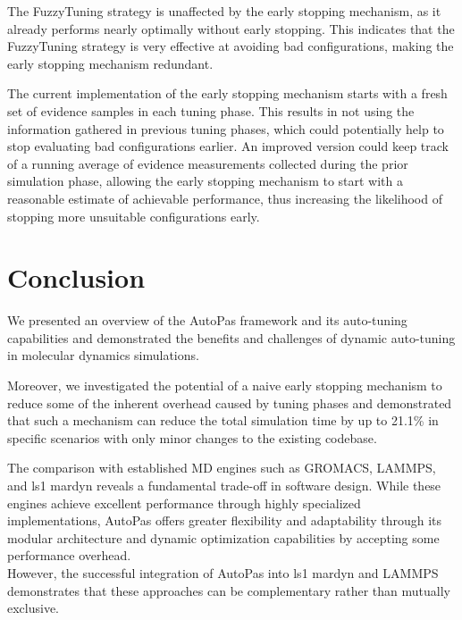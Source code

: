 \documentclass[conference]{IEEEtran}
\begin{document}
\begin{description}[leftmargin=1.2em, font=\itshape, style=nextline]
        The FuzzyTuning strategy is unaffected by the early stopping mechanism, as it already performs nearly optimally without early stopping. This indicates that the FuzzyTuning strategy is very effective at avoiding bad configurations, making the early stopping mechanism redundant.

    \item[Future Work:]
        The current implementation of the early stopping mechanism starts with a fresh set of evidence samples in each tuning phase. This results in not using the information gathered in previous tuning phases, which could potentially help to stop evaluating bad configurations earlier. An improved version could keep track of a running average of evidence measurements collected during the prior simulation phase, allowing the early stopping mechanism to start with a reasonable estimate of achievable performance, thus increasing the likelihood of stopping more unsuitable configurations early.
\end{description}

\section{Conclusion}

We presented an overview of the AutoPas framework and its auto-tuning capabilities and demonstrated the benefits and challenges of dynamic auto-tuning in molecular dynamics simulations.

Moreover, we investigated the potential of a naive early stopping mechanism to reduce some of the inherent overhead caused by tuning phases and demonstrated that such a mechanism can reduce the total simulation time by up to 21.1\% in specific scenarios with only minor changes to the existing codebase.

The comparison with established MD engines such as GROMACS, LAMMPS, and ls1 mardyn reveals a fundamental trade-off in software design. While these engines achieve excellent performance through highly specialized implementations, AutoPas offers greater flexibility and adaptability through its modular architecture and dynamic optimization capabilities by accepting some performance overhead.\\
However, the successful integration of AutoPas into ls1 mardyn and LAMMPS demonstrates that these approaches can be complementary rather than mutually exclusive.

\newpage



\end{document}
